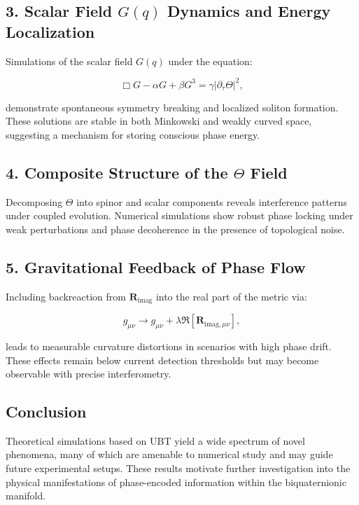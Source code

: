\subsection*{3. Scalar Field \(G(q)\) Dynamics and Energy Localization}

Simulations of the scalar field \(G(q)\) under the equation:

\[
\Box G - \alpha G + \beta G^3 = \gamma |\partial_\tau \Theta|^2,
\]

demonstrate spontaneous symmetry breaking and localized soliton formation. These solutions are stable in both Minkowski and weakly curved space, suggesting a mechanism for storing conscious phase energy.

\subsection*{4. Composite Structure of the \(\Theta\) Field}

Decomposing \(\Theta\) into spinor and scalar components reveals interference patterns under coupled evolution. Numerical simulations show robust phase locking under weak perturbations and phase decoherence in the presence of topological noise.

\subsection*{5. Gravitational Feedback of Phase Flow}

Including backreaction from \(\mathbf{R}_{\text{imag}}\) into the real part of the metric via:

\[
g_{\mu\nu} \rightarrow g_{\mu\nu} + \lambda \Re[\mathbf{R}_{\text{imag}, \mu\nu}],
\]

leads to measurable curvature distortions in scenarios with high phase drift. These effects remain below current detection thresholds but may become observable with precise interferometry.

\subsection*{Conclusion}

Theoretical simulations based on UBT yield a wide spectrum of novel phenomena, many of which are amenable to numerical study and may guide future experimental setups. These results motivate further investigation into the physical manifestations of phase-encoded information within the biquaternionic manifold.
